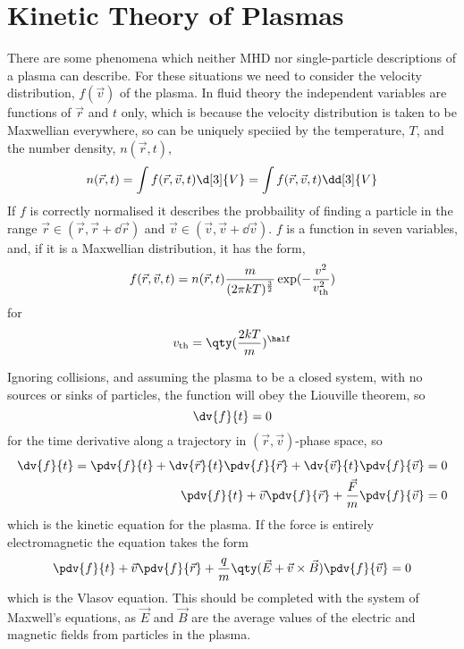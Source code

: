 \documentclass{book}         		                %
\begin{document}
\section{Kinetic Theory of Plasmas}
\label{sec:kinet-theory-plasm}

There are some phenomena which neither MHD nor single-particle
descriptions of a plasma can describe. For these situations we need to
consider the velocity distribution, $f(\vec{v})$ of the plasma.  In
fluid theory the independent variables are functions of $\vec{r}$ and
$t$ only, which is because the velocity distribution is taken to be
Maxwellian everywhere, so can be uniquely speciied by the temperature,
$T$, and the number density, $n(\vec{r}, t)$,
\[ n(\vec{r}, t) = \int f(\vec{r}, \vec{v}, t) \d[3]{V} = \int
f(\vec{r}, \vec{v}, t) \dd[3]{V} \] If $f$ is correctly normalised it
describes the probbaility of finding a particle in the range $\vec{r}
\in (\vec{r}, \vec{r}+\dd{\vec{r}})$ and $\vec{v} \in (\vec{v},
\vec{v}+\dd{\vec{v}})$.  $f$ is a function in seven variables, and, if
it is a Maxwellian distribution, it has the form,
\begin{equation}
  \label{eq:28}
  f(\vec{r}, \vec{v}, t) = n(\vec{r}, t) \frac{m}{(2 \pi k T)^{\frac{3}{2}}} \exp( - \frac{v^2}{v_{\rm th}^2})
\end{equation}
for 
\[ v_{\rm th} = \qty(\frac{2kT}{m})^{\half} \]

Ignoring collisions, and assuming the plasma to be a closed system,
with no sources or sinks of particles, the function will obey the
Liouville theorem, so
\[ \dv{f}{t} = 0 \] for the time derivative along a trajectory in
$(\vec{r}, \vec{v})$-phase space, so
\begin{align*}
  \dv{f}{t} = \pdv{f}{t} + \dv{\vec{r}}{t} \pdv{f}{\vec{r}} + \dv{\vec{v}}{t} \pdv{f}{\vec{v}} &= 0 \\
\pdv{f}{t} + \vec{v} \pdv{f}{\vec{r}} + \frac{\vec{F}}{m} \pdv{f}{\vec{v}} &= 0
\end{align*}
which is the kinetic equation for the plasma. If the force is entirely
electromagnetic the equation takes the form
\begin{equation}
  \label{eq:29}
  \pdv{f}{t} + \vec{v} \pdv{f}{\vec{r}} + \frac{q}{m} \qty( \vec{E} + \vec{v} \times \vec{B}) \pdv{f}{\vec{v}} = 0
\end{equation}
which is the Vlasov equation. This should be completed with the system
of Maxwell's equations, as $\vec{E}$ and $\vec{B}$ are the average
values of the electric and magnetic fields from particles in the
plasma.
\end{document}
